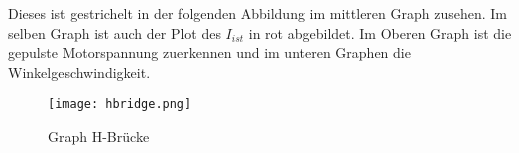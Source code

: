 Dieses ist gestrichelt in der folgenden Abbildung im mittleren Graph zusehen.
Im selben Graph ist auch der Plot des $I_{ist}$ in rot abgebildet. Im Oberen Graph
ist die gepulste Motorspannung zuerkennen und im unteren Graphen die Winkelgeschwindigkeit.

\begin{figure}[H]
    \centering
    \texttt{[image: hbridge.png]}
    \caption{Graph H-Brücke}
    \label{fig:Graph H-Bridge}
\end{figure}

